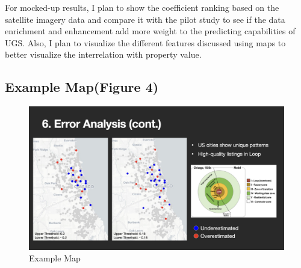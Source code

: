 \documentclass{article}
\begin{document}
For mocked-up results, I plan to show the coefficient ranking based on the satellite imagery data and compare it with the pilot study to see if the data enrichment and enhancement add more weight to the predicting capabilities of UGS. Also, I plan to visualize the different features discussed using maps to better visualize the interrelation with property value.

\subsection*{Example Map(Figure 4)}
\begin{figure}[h]
  \centering
  \includegraphics[width=\textwidth]{Visual/examplemap.jpeg}
  \caption{Example Map}
\end{figure}
\end{document}
